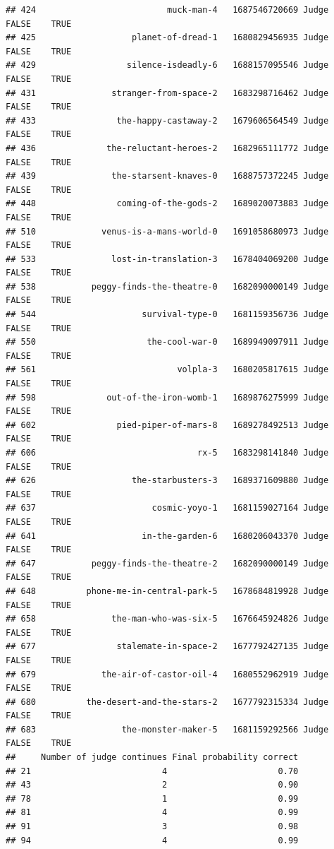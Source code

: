 \documentclass[
]{article}
\begin{document}
\begin{verbatim}
## 424                          muck-man-4   1687546720669 Judge   FALSE    TRUE
## 425                   planet-of-dread-1   1680829456935 Judge   FALSE    TRUE
## 429                  silence-isdeadly-6   1688157095546 Judge   FALSE    TRUE
## 431               stranger-from-space-2   1683298716462 Judge   FALSE    TRUE
## 433                the-happy-castaway-2   1679606564549 Judge   FALSE    TRUE
## 436              the-reluctant-heroes-2   1682965111772 Judge   FALSE    TRUE
## 439               the-starsent-knaves-0   1688757372245 Judge   FALSE    TRUE
## 448                coming-of-the-gods-2   1689020073883 Judge   FALSE    TRUE
## 510             venus-is-a-mans-world-0   1691058680973 Judge   FALSE    TRUE
## 533               lost-in-translation-3   1678404069200 Judge   FALSE    TRUE
## 538           peggy-finds-the-theatre-0   1682090000149 Judge   FALSE    TRUE
## 544                     survival-type-0   1681159356736 Judge   FALSE    TRUE
## 550                      the-cool-war-0   1689949097911 Judge   FALSE    TRUE
## 561                            volpla-3   1680205817615 Judge   FALSE    TRUE
## 598              out-of-the-iron-womb-1   1689876275999 Judge   FALSE    TRUE
## 602                pied-piper-of-mars-8   1689278492513 Judge   FALSE    TRUE
## 606                                rx-5   1683298141840 Judge   FALSE    TRUE
## 626                   the-starbusters-3   1689371609880 Judge   FALSE    TRUE
## 637                       cosmic-yoyo-1   1681159027164 Judge   FALSE    TRUE
## 641                     in-the-garden-6   1680206043370 Judge   FALSE    TRUE
## 647           peggy-finds-the-theatre-2   1682090000149 Judge   FALSE    TRUE
## 648          phone-me-in-central-park-5   1678684819928 Judge   FALSE    TRUE
## 658               the-man-who-was-six-5   1676645924826 Judge   FALSE    TRUE
## 677                stalemate-in-space-2   1677792427135 Judge   FALSE    TRUE
## 679             the-air-of-castor-oil-4   1680552962919 Judge   FALSE    TRUE
## 680          the-desert-and-the-stars-2   1677792315334 Judge   FALSE    TRUE
## 683                 the-monster-maker-5   1681159292566 Judge   FALSE    TRUE
##     Number of judge continues Final probability correct
## 21                          4                      0.70
## 43                          2                      0.90
## 78                          1                      0.99
## 81                          4                      0.99
## 91                          3                      0.98
## 94                          4                      0.99

\end{verbatim}
\end{document}
